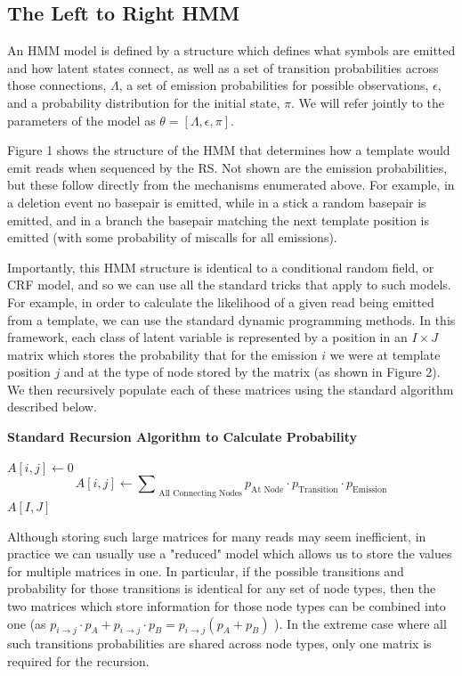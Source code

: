 \documentclass[fleqn,10pt]{SelfArx} %
\begin{document}
\subsection{The Left to Right HMM}
An HMM model is defined by a structure which defines what symbols are emitted and how latent states connect, as well as a set of transition probabilities across those connections, $\Lambda$, a set of emission probabilities for possible observations, $\epsilon$, and a probability distribution for the initial state, $\pi$.   We will refer jointly to the parameters of the model as $\theta = [\Lambda, \epsilon, \pi]$.


Figure 1 shows the structure of the HMM that determines how a template would emit reads when sequenced by the RS.  Not shown are the emission probabilities, but these follow directly from the mechanisms enumerated above.  For example, in a deletion event no basepair is emitted, while in a stick a random basepair is emitted, and in a branch the basepair matching the next template position is emitted (with some probability of miscalls for all emissions).   

Importantly, this HMM structure is identical to a conditional random field, or CRF model, and so we can use all the standard tricks that apply to such models.  For example, in order to calculate the likelihood of a given read being emitted from a template, we can use the standard dynamic programming methods.  In this framework, each class of latent variable is represented by a position in an $ I \times J$ matrix which stores the probability that for the emission $i$ we were at template position $j$ and at the type of node stored by the matrix (as shown in Figure 2).  We then recursively populate each of these matrices using the standard algorithm described below.

\begin{algorithm}
\caption*{\textbf{Standard Recursion Algorithm to Calculate Probability }}
\label{calcScore}
\begin{algorithmic}[h]
\STATE $A[i,j] \leftarrow 0$
\ELSE
\STATE \[
	A[i,j]  \leftarrow \sum\nolimits_{\text{ All Connecting Nodes} } p_{\text{At Node}} \cdot p_{\text{Transition}} \cdot p_{\text{Emission}}
	\]
\ENDIF	
\ENDFOR
\ENDFOR
\RETURN $A[I,J]$
\end{algorithmic}
\end{algorithm}



Although storing such large matrices for many reads may seem inefficient, in practice we can usually use a "reduced" model which allows us to store the values for multiple matrices in one.  In particular, if the possible transitions and probability for those transitions is identical for any set of node types, then the two matrices which store information for those node types can be combined into one (as  $p_{i \rightarrow j} \cdot p_{A} + p_{i \rightarrow j} \cdot p_{B} = p_{i \rightarrow j} (p_{A} + p_{B})  $ ).  In the extreme case where all such transitions probabilities are shared across node types, only one matrix is required for the recursion.
\end{document}
